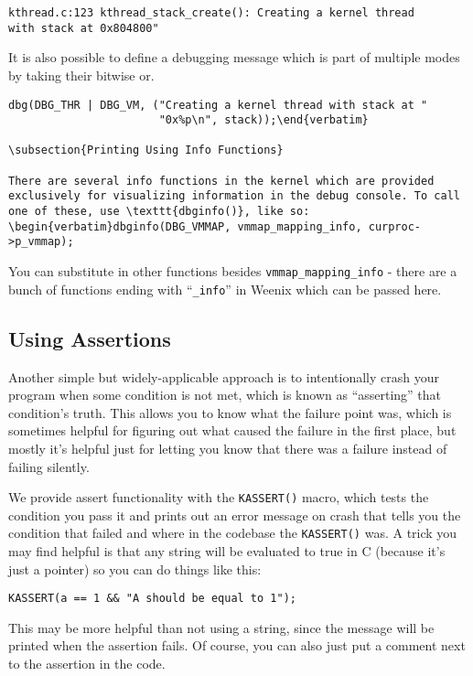 \begin{verbatim}
kthread.c:123 kthread_stack_create(): Creating a kernel thread
with stack at 0x804800"\end{verbatim}

It is also possible to define a debugging message which is part of multiple modes by taking their bitwise or.
\begin{verbatim}
dbg(DBG_THR | DBG_VM, ("Creating a kernel thread with stack at "
                       "0x%p\n", stack));\end{verbatim}

\subsection{Printing Using Info Functions}

There are several info functions in the kernel which are provided exclusively for visualizing information in the debug console. To call one of these, use \texttt{dbginfo()}, like so:
\begin{verbatim}dbginfo(DBG_VMMAP, vmmap_mapping_info, curproc->p_vmmap);\end{verbatim}
You can substitute in other functions besides \texttt{vmmap\_mapping\_info} - there are a bunch of functions ending with ``\texttt{\_info}'' in Weenix which can be passed here.

\subsection{Using Assertions}

Another simple but widely-applicable approach is to intentionally crash your program when some condition is not met, which is known as ``asserting'' that condition's truth. This allows you to know what the failure point was, which is sometimes helpful for figuring out what caused the failure in the first place, but mostly it's helpful just for letting you know that there was a failure instead of failing silently.

We provide assert functionality with the \texttt{KASSERT()} macro, which tests the condition you pass it and prints out an error message on crash that tells you the condition that failed and where in the codebase the \texttt{KASSERT()} was. A trick you may find helpful is that any string will be evaluated to true in C (because it's just a pointer) so you can do things like this:
\begin{verbatim}
KASSERT(a == 1 && "A should be equal to 1");\end{verbatim}
This may be more helpful than not using a string, since the message will be printed when the assertion fails. Of course, you can also just put a comment next to the assertion in the code.

